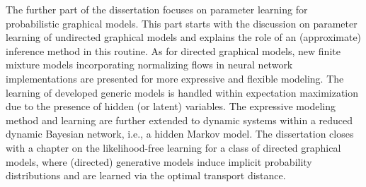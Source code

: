 The further part of the dissertation focuses on parameter learning for probabilistic graphical models. This part starts with the discussion on parameter learning of undirected graphical models and explains the role of an (approximate) inference method in this routine. As for directed graphical models, new finite mixture models incorporating normalizing flows in neural network implementations are presented for more expressive and flexible modeling. The learning of developed generic models is handled within expectation maximization due to the presence of hidden (or latent) variables. The expressive modeling method and learning are further extended to dynamic systems within a reduced dynamic Bayesian network, i.e., a hidden Markov model. The dissertation closes with a chapter on the likelihood-free learning for a class of directed graphical models, where (directed) generative models induce implicit probability distributions and are learned via the optimal transport distance.


